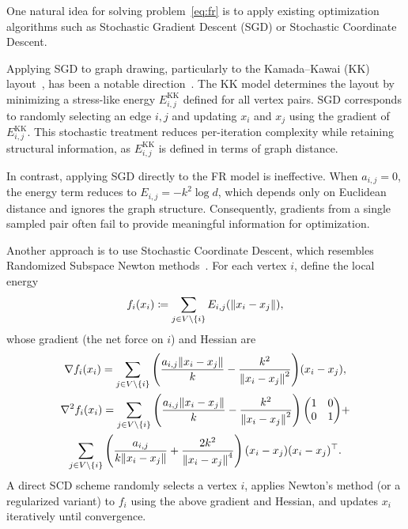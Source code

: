 \documentclass[11pt]{article}
\newcommand{\defeq}{\coloneqq}
\begin{document}
One natural idea for solving problem~\eqref{eq:fr} is to apply existing optimization algorithms such as Stochastic Gradient Descent (SGD) or Stochastic Coordinate Descent.

Applying SGD to graph drawing, particularly to the Kamada–Kawai (KK) layout~\citep{kamadaAlgorithmDrawingGeneral1989}, has been a notable direction~\citep{zhengGraphDrawingStochastic2019,ahmedMulticriteriaScalableGraph2021}. The KK model determines the layout by minimizing a stress-like energy $E_{i,j}^{\mathrm{KK}}$ defined for all vertex pairs. SGD corresponds to randomly selecting an edge ${i,j}$ and updating $x_i$ and $x_j$ using the gradient of $E_{i,j}^{\mathrm{KK}}$. This stochastic treatment reduces per-iteration complexity while retaining structural information, as $E_{i,j}^{\mathrm{KK}}$ is defined in terms of graph distance.

In contrast, applying SGD directly to the FR model is ineffective. When $a_{i,j}=0$, the energy term reduces to $E_{i,j}=-k^{2}\log d$, which depends only on Euclidean distance and ignores the graph structure. Consequently, gradients from a single sampled pair often fail to provide meaningful information for optimization.

Another approach is to use Stochastic Coordinate Descent, which resembles Randomized Subspace Newton methods~\citep{NEURIPS2019_bc6dc48b, fujiRandomizedSubspaceRegularized2022, cartisRandomisedSubspaceMethods2022, nozawaRandomizedSubspaceGradient2023, higuchiFastConvergenceSecondOrder2024}.
For each vertex $i$, define the local energy
\begin{equation}\label{eq:fi}
  f_{i}(x_{i}) \defeq \sum_{j \in V \setminus \{i\}}E_{i,j}(\norm{x_i - x_j}),
\end{equation}
whose gradient (the net force on $i$) and Hessian are
\begin{gather*}\label{eq:gradientFi}
  \nabla f_{i}(x_{i}) = \sum_{j \in V \setminus \{i\}} \qty(\frac{a_{i,j}\norm{x_i - x_j}}{k}- \frac{k^{2}}{\norm{x_i - x_j}^{2}}) (x_{i}-x_{j}),\\
  \nabla^{2}f_{i}(x_{i}) = \sum_{j \in V \setminus \{i\}}\left(\frac{a_{i,j}\norm{x_i - x_j}}{k} - \frac{k^{2}}{\norm{x_i - x_j}^{2}}\right) \mqty(1&0\\0&1)+ \\
  \sum_{j \in V \setminus \{i\}}\left(\frac{a_{i,j}}{k \norm{x_i - x_j}}+ \frac{2k^{2}}{\norm{x_i - x_j}^{4}}
  \right) (x_{i}- x_{j})(x_{i}- x_{j})^{\top}.
\end{gather*}
A direct SCD scheme randomly selects a vertex $i$, applies Newton’s method (or a regularized variant) to $f_{i}$ using the above gradient and Hessian, and updates $x_{i}$ iteratively until convergence.
\end{document}
